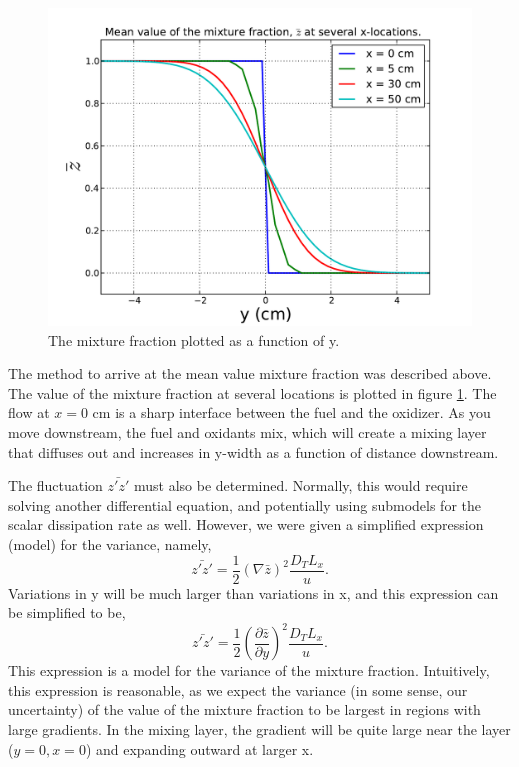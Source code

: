 \documentclass{article}
\begin{document}
  \begin{figure}[!htb]
   \begin{center}
    \includegraphics[width = 12 cm]{figs/mean.pdf}
    \caption{The mixture fraction plotted as a function of y.}
    \label{mean}
   \end{center}
   \end{figure}

The method to arrive at the mean value mixture fraction was described
above. The value of the mixture fraction at several locations is plotted
in figure \ref{mean}. The flow at $x=0$ cm is a sharp interface between
the fuel and the oxidizer. As you move downstream, the fuel and oxidants 
mix, which will create a mixing layer that diffuses out and increases in
y-width as a function of distance downstream. 

The fluctuation $\bar{z'z'}$
must also be determined. Normally, this would require solving another differential equation, 
and potentially using submodels for the scalar dissipation rate as well. However, we were given a
simplified expression (model) for the variance, namely,
\begin{equation}
 \bar{z'z'} = \frac{1}{2} (\nabla \bar z)^2 \frac{D_T L_x}{u}. 
\end{equation}
Variations in y will be much larger than variations in x, and this expression 
can be simplified to be,
\begin{equation}
 \bar{z'z'} = \frac{1}{2} (\frac{\partial \bar z}{\partial y})^2 \frac{D_T L_x}{u}. 
 \label{fluc}
\end{equation}
This expression is a model for the variance of the mixture
fraction. Intuitively, this expression is reasonable,  as we expect the
variance (in some sense, our uncertainty) of the value of the mixture
fraction to be largest in regions with large gradients. In the mixing
layer, the gradient will be quite large near the layer ($y=0,x=0$) and expanding outward  at larger x. 
\end{document}
